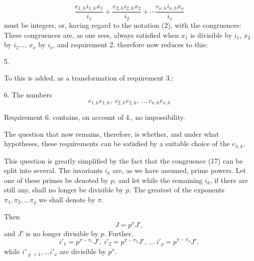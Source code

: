 \[
\frac{e_{1,h}i_{1,h}x_1}{i_1} + \frac{e_{2,h}i_{2,h}x_2}{i_2} + \cdots \frac{e_{\nu,h}i_{\nu,h}x_\nu}{i_\nu}
\]
must be integers, or, having regard to the notation (2), with the congruences:
These congruences are, as one sees, always satisfied when
$x_1$ is divisible by $i_1$, $x_2$ by $i_2 \dots$, $x_\nu$ by $i_\nu$, and
requirement 2. therefore now reduces to this:

    5. 

    To this is added, as a transformation of requirement 3.:

    6. The numbers
\[
c_{1,h}e_{1,h},\ c_{2,h}e_{2,h},\ \dots\ c_{\nu,h}e_{\nu,h}
\]

    Requirement 6. contains, on account of 4., no impossibility.


    The question that now remains, therefore, is whether, and under what hypotheses, these requirements can be satisfied by a suitable choice of the $e_{h,k}$.

    This question is greatly simplified by the fact that the
congruence (17) can be split into several. The invariants $i_k$
are, as we have assumed, prime powers. Let one of these
primes be denoted by $p$, and let
while the remaining $i_k$, if there are still any, shall no longer
be divisible by $p$. The greatest of the exponents $\pi_1, \pi_2, \dots \pi_\varrho$ we shall denote by $\pi$.

    Then
\[
J = p^\pi J',
\]
and $J'$ is no longer divisible by $p$. Further,
\[
i'_1 = p^{\pi-\pi_1}J',\ i'_2 = p^{\pi-\pi_2}J',\ \dots\ i'_\varrho = p^{\pi-\pi_\varrho}J',
\]
while $i'_{\varrho+1}, \dots i'_\nu$ are divisible by $p^\pi$.
